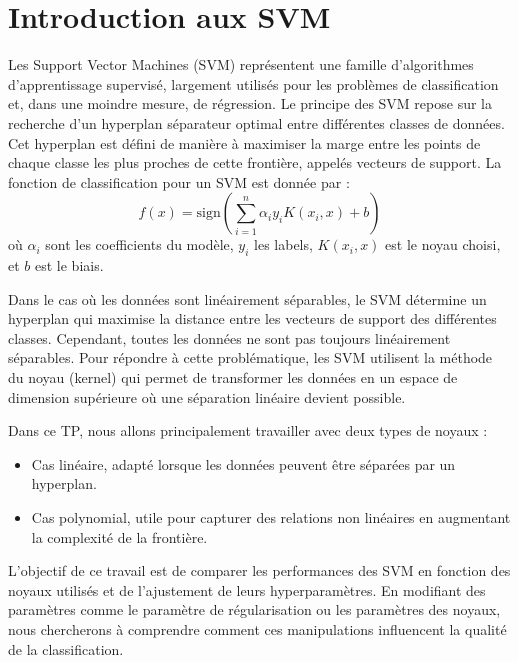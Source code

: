 \documentclass{article}
\begin{document}
\setlength\parindent{0mm}



\newpage
\renewcommand{\contentsname}{Table des matières}
\tableofcontents

\newpage

\section{Introduction aux SVM}
\hspace{7pt} Les Support Vector Machines (SVM) représentent une famille d'algorithmes d'apprentissage supervisé, largement utilisés pour les problèmes de classification et, dans une moindre mesure, de régression. Le principe des SVM repose sur la recherche d'un hyperplan séparateur optimal entre différentes classes de données. Cet hyperplan est défini de manière à maximiser la marge entre les points de chaque classe les plus proches de cette frontière, appelés vecteurs de support. La fonction de classification pour un SVM est donnée par :
\[
f(x) = \text{sign}\left(\sum_{i=1}^{n} \alpha_i y_i K(x_i, x) + b\right)
\]
où \(\alpha_i\) sont les coefficients du modèle, \(y_i\) les labels, \(K(x_i, x)\) est le noyau choisi, et \(b\) est le biais.\newline


\hspace{7pt} Dans le cas où les données sont linéairement séparables, le SVM détermine un hyperplan qui maximise la distance entre les vecteurs de support des différentes classes. Cependant, toutes les données ne sont pas toujours linéairement séparables. Pour répondre à cette problématique, les SVM utilisent la méthode du noyau (kernel) qui permet de transformer les données en un espace de dimension supérieure où une séparation linéaire devient possible.\newline

\hspace{7pt} Dans ce TP, nous allons principalement travailler avec deux types de noyaux :
\begin{itemize}
    \item Cas linéaire, adapté lorsque les données peuvent être séparées par un hyperplan.
    \item Cas polynomial, utile pour capturer des relations non linéaires en augmentant la complexité de la frontière.
\end{itemize}

\hspace{7pt} L'objectif de ce travail est de comparer les performances des SVM en fonction des noyaux utilisés et de l'ajustement de leurs hyperparamètres. En modifiant des paramètres comme le paramètre de régularisation ou les paramètres des noyaux, nous chercherons à comprendre comment ces manipulations influencent la qualité de la classification.
\end{document}
